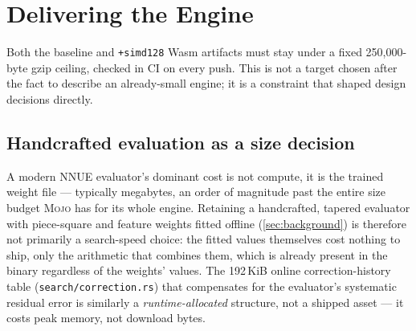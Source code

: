 \documentclass[10pt,twocolumn]{article}
\newcommand{\engine}{\textsc{Mojo}}
\newcommand{\code}[1]{\texttt{#1}}
\begin{document}
\begin{table}[t]
\centering
\small
\caption{Cross-worker PV seeding: node count for a $(D{-}1)$-depth search of
the position reached after the analysis worker's depth-$D$ PV first move,
cold versus seeded from that PV's remainder.}
\label{tab:seeding}
\end{table}

\section{Delivering the Engine}
\label{sec:delivery}

Both the baseline and \code{+simd128} Wasm artifacts must stay under a fixed
250,000-byte gzip ceiling, checked in CI on every push. This is not a
target chosen after the fact to describe an already-small engine; it is a
constraint that shaped design decisions directly.

\subsection{Handcrafted evaluation as a size decision}

A modern NNUE evaluator's dominant cost is not compute, it is the trained
weight file --- typically megabytes, an order of magnitude past the entire
size budget \engine{} has for its whole engine. Retaining a handcrafted,
tapered evaluator with piece-square and feature weights fitted offline
(\cref{sec:background}) is therefore not primarily a search-speed choice:
the fitted values themselves cost nothing to ship, only the arithmetic that
combines them, which is already present in the binary regardless of the
weights' values. The 192\,KiB online correction-history table
(\code{search/correction.rs}) that compensates for the evaluator's
systematic residual error is similarly a \emph{runtime-allocated} structure,
not a shipped asset --- it costs peak memory, not download bytes.
\end{document}
